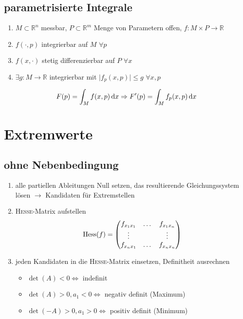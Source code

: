 \documentclass[ngerman,a4paper]{article}
\begin{document}
\subsection{parametrisierte Integrale}
\begin{enumerate}[label=\textbf{\arabic*.}]
	\item $M\subset\mathbb{R}^n$ messbar, $P\subset\mathbb{R}^m$ Menge von Parametern offen, $f:M\times P\to\mathbb{R}$
	\item $f(\cdot, p)$ integrierbar auf $M$ $\forall p$
	\item $f(x,\cdot)$ stetig differenzierbar auf $P$ $\forall x$
	\item $\exists g:M\to\mathbb{R}$ integrierbar mit $\vert f_p(x,p)\vert\le g$ $\forall x,p$
\end{enumerate}
\begin{align}
	F(p)=\int_M f(x,p)\,\mathrm{d}x\Rightarrow F'(p)=\int_M f_p(x,p)\,\mathrm{d}x\notag
\end{align}

\section{Extremwerte}
\subsection{ohne Nebenbedingung}
\begin{enumerate}[label=\textbf{\arabic*.}]
	\item alle partiellen Ableitungen Null setzen, das resultierende Gleichungssystem lösen $\to$ Kandidaten für Extremstellen
	\item \textsc{Hesse}-Matrix aufstellen
	\begin{align}
		\text{Hess}(f)=\begin{pmatrix}f_{x_1x_1} & \dots & f_{x_1x_n} \\ \vdots & & \vdots \\ f_{x_nx_1} & \dots & f_{x_nx_n}\end{pmatrix}\notag
	\end{align}
	\item jeden Kandidaten in die \textsc{Hesse}-Matrix einsetzen, Definitheit ausrechnen
	\begin{itemize}
		\item $\det(A)<0\Leftrightarrow$ indefinit
		\item $\det(A)>0, a_1<0\Leftrightarrow$ negativ definit (Maximum)
		\item $\det(-A)>0, a_1>0\Leftrightarrow$ positiv definit (Minimum)
	\end{itemize}
\end{enumerate}
\end{document}
